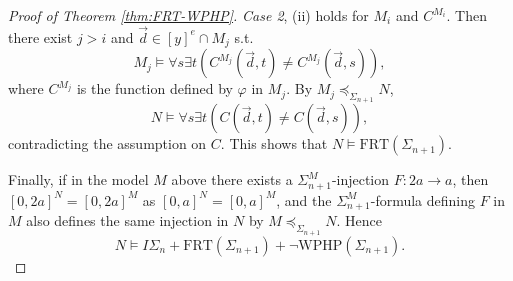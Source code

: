 \documentclass[10pt,a4paper]{amsart}
\newcommand{\FRT}{\mathrm{FRT}}
\newcommand{\WPHP}{\mathrm{WPHP}}
\begin{document}
\begin{proof}[Proof of Theorem \ref{thm:FRT-WPHP}]
\emph{Case 2}, (ii) holds for $M_i$ and $C^{M_i}$.
Then there exist $j > i$ and $\vec{d} \in [y]^e \cap M_j$ s.t.
\[
  M_j \models \forall s \exists t( C^{M_j}(\vec{d},t) \neq C^{M_j}(\vec{d},s) ),
\]
where $C^{M_j}$ is the function defined by $\varphi$ in $M_j$.
By $M_j \preceq_{\Sigma_{n+1}} N$,
\[
  N \models \forall s \exists t( C(\vec{d},t) \neq C(\vec{d},s) ),
\]
contradicting the assumption on $C$.
This shows that $N \models \FRT(\Sigma_{n+1})$.

Finally, if in the model $M$ above there exists a $\Sigma_{n+1}^M$-injection $F: 2a \to a$,
then $[0,2a]^N = [0,2a]^M$ as $[0,a]^N = [0,a]^M$,
and the $\Sigma_{n+1}^M$-formula defining $F$ in $M$ also defines the same injection in $N$ by $M \preceq_{\Sigma_{n+1}} N$.
Hence
\[
  N \models I\Sigma_n + \FRT(\Sigma_{n+1}) + \neg \WPHP(\Sigma_{n+1}).
\]
\end{proof}
\end{document}
